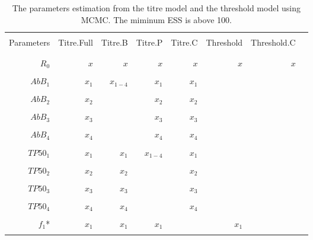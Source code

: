 \documentclass[12pt,a4paper]{article}
\begin{document}
\begin{table}[ht]
\begin{minipage}{\textwidth}     
\centering %
\caption{The parameters estimation from the titre model and the threshold model using MCMC. The miminum ESS is above 100.}
\centering %
\begin{tabular}{rrrrrrrr}

\hline\hline \\%
Parameters &       Titre.Full	 &  Titre.B & Titre.P & Titre.C & Threshold & Threshold.C\\ \\
\hline %
   \\
   $R_{0}$   &   $x$ &    	$x$        & $x$      & $x$  & $x$  & $x$ \\ \\
      
   $AbB_{1}$ &   $x_{1}$ &  $x_{1-4}$  & $x_{1}$  & $x_{1}$ & &\\ \\

   $AbB_{2}$ &   $x_{2}$ &   		   & $x_{2}$  & $x_{2}$ & &\\ \\

   $AbB_{3}$ &   $x_{3}$ &   		   & $x_{3}$  & $x_{3}$ & &\\ \\

   $AbB_{4}$ &   $x_{4}$ &   		   & $x_{4}$  & $x_{4}$ & &\\ \\
      
   $\mathit{TP50_{1}}$ & $x_{1}$ &  $x_{1}$ & $x_{1-4}$	& $x_{1}$ & &\\ \\

   $\mathit{TP50_{2}}$ & $x_{2}$ &  $x_{2}$ & 		    & $x_{2}$ & &\\ \\

   $\mathit{TP50_{3}}$ & $x_{3}$ &  $x_{3}$ &			& $x_{3}$ & &\\ \\

   $\mathit{TP50_{4}}$ & $x_{4}$ &  $x_{4}$ &			& $x_{4}$ &\\ \\

   $f_{1}$*            &   $x_{1}$   &  $x_{1}$     & $x_{1}$ & & $x_{1}$ & \\ \\
\hline

\end{tabular}
\end{minipage}
\end{table}
\end{document}
